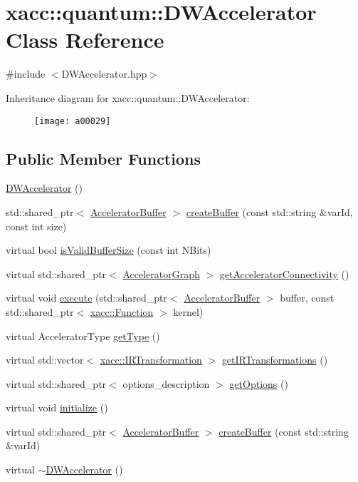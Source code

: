 \hypertarget{a00029}{}\section{xacc\+:\+:quantum\+:\+:D\+W\+Accelerator Class Reference}
\label{a00029}


{\ttfamily \#include $<$D\+W\+Accelerator.\+hpp$>$}

Inheritance diagram for xacc\+:\+:quantum\+:\+:D\+W\+Accelerator\+:\begin{figure}[H]
\begin{center}
\leavevmode
\texttt{[image: a00029]}
\end{center}
\end{figure}
\subsection*{Public Member Functions}
\begin{DoxyCompactItemize}
\item 
\hyperlink{a00029_ad6924d7e9812df5e4676109352ee74a7}{D\+W\+Accelerator} ()
\item 
std\+::shared\+\_\+ptr$<$ \hyperlink{a00013}{Accelerator\+Buffer} $>$ \hyperlink{a00029_a718d7cb51a35e694d960385e1ea2f99f}{create\+Buffer} (const std\+::string \&var\+Id, const int size)
\item 
virtual bool \hyperlink{a00029_a4c2ee30212a919d8ddf7f9555df25195}{is\+Valid\+Buffer\+Size} (const int N\+Bits)
\item 
virtual std\+::shared\+\_\+ptr$<$ \hyperlink{a00043}{Accelerator\+Graph} $>$ \hyperlink{a00029_a006afa60749790681fc76beddc254926}{get\+Accelerator\+Connectivity} ()
\item 
virtual void \hyperlink{a00029_aa8d770acb2708b3ee1cd1f21bd0cc668}{execute} (std\+::shared\+\_\+ptr$<$ \hyperlink{a00013}{Accelerator\+Buffer} $>$ buffer, const std\+::shared\+\_\+ptr$<$ \hyperlink{a00038}{xacc\+::\+Function} $>$ kernel)
\item 
virtual Accelerator\+Type \hyperlink{a00029_abe50e427b4bec0460cc238405cb569f9}{get\+Type} ()
\item 
virtual std\+::vector$<$ \hyperlink{a00051}{xacc\+::\+I\+R\+Transformation} $>$ \hyperlink{a00029_a89da20bd079a22d6581ea2da2293b973}{get\+I\+R\+Transformations} ()
\item 
virtual std\+::shared\+\_\+ptr$<$ options\+\_\+description $>$ \hyperlink{a00029_a09926db9f99706307ae6ce5b56845bca}{get\+Options} ()
\item 
virtual void \hyperlink{a00029_acaefd5747409f31cf5c3e42d98475ce2}{initialize} ()
\item 
virtual std\+::shared\+\_\+ptr$<$ \hyperlink{a00013}{Accelerator\+Buffer} $>$ \hyperlink{a00029_add60637a4b3c055e7f2ffa3bf8e320ac}{create\+Buffer} (const std\+::string \&var\+Id)
\item 
virtual \hyperlink{a00029_ad06f92a271d445c2a1ff8364faa3617b}{$\sim$\+D\+W\+Accelerator} ()
\end{DoxyCompactItemize}
